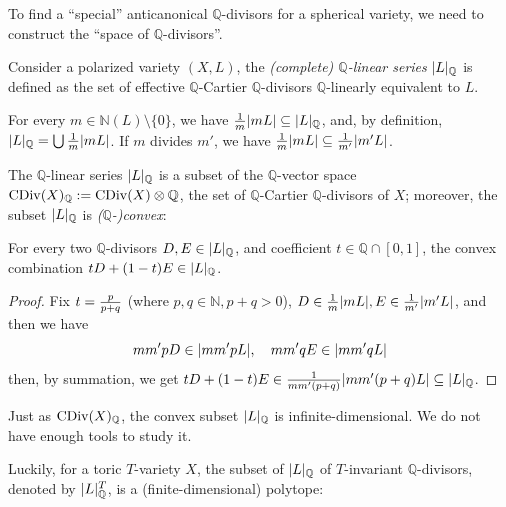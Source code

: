 \newcommand{\Qls}[1]{\ls{#1}_\mathbb{Q}}
\newcommand{\divQ}{\mathrm{div}_\mathbb{Q}}

To find a ``special'' anticanonical $\mathbb{Q}$-divisors for a spherical variety, we need to construct the ``space of $\mathbb{Q}$-divisors''.

\begin{definition}
	Consider a polarized variety $(X, L)$, the \emph{(complete) $\mathbb{Q}$-linear series} $\Qls{L}$ is defined as the set of effective $\mathbb{Q}$-Cartier $\mathbb{Q}$-divisors $\mathbb{Q}$-linearly equivalent to $L$.
\end{definition}

For every $m \in \mathbb{N}(L) \setminus \{0\}$, we have ${1 \over m} \ls{m L} \subseteq \Qls{L}$, and, by definition, $\Qls{L} = \bigcup {1 \over m} \ls{m L}$. If $m$ divides $m'$, we have ${1 \over m} \ls{m L} \subseteq {1 \over m'} \ls{m' L}$.

The $\mathbb{Q}$-linear series $\Qls{L}$ is a subset of the $\mathbb{Q}$-vector space $\mathrm{CDiv}(X)_\mathbb{Q} := \mathrm{CDiv}(X) \otimes \mathbb{Q}$, the set of $\mathbb{Q}$-Cartier $\mathbb{Q}$-divisors of $X$; moreover, the subset $\Qls{L}$ is \emph{($\mathbb{Q}$-)convex}:
\begin{proposition}
	For every two $\mathbb{Q}$-divisors $D, E \in \Qls{L}$, and coefficient $t \in \mathbb{Q} \cap [0, 1]$, the convex combination $t D + (1 - t) E \in \Qls{L}$.
\end{proposition}
\begin{proof}
	Fix $t = {p \over p + q}$ (where $p, q \in \mathbb{N}, p + q > 0$), $D \in {1 \over m} \ls{m L}, E \in {1 \over m'} \ls{m' L}$, and then we have
	\begin{equation*}
		m m' p D \in \mathopen{}\left|m m' p L\right|\mathclose{}, \quad m m' q E \in \mathopen{}\left|m m' q L\right|\mathclose{}
	\end{equation*}
	then, by summation, we get  $t D + (1 - t) E \in {1 \over m m' (p + q)} \ls{m m' (p + q) L} \subseteq \Qls{L}$.
\end{proof}

Just as $\mathrm{CDiv}(X)_\mathbb{Q}$, the convex subset $\Qls{L}$ is infinite-dimensional. We do not have enough tools to study it.

Luckily, for a toric $T$-variety $X$, the subset of $\Qls{L}$ of $T$-invariant $\mathbb{Q}$-divisors, denoted by $\Qls{L}^T$, is a (finite-dimensional) polytope:

